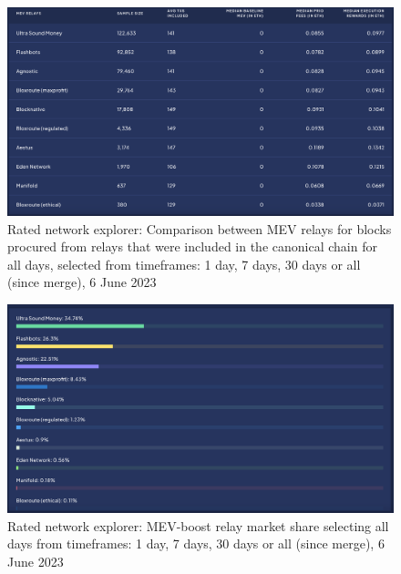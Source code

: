 \documentclass[UTF8]{article}
\begin{document}
{\begin{figure}[htbp]
\begin{center}
\includegraphics[width=\linewidth]{images/ratedrelay2}
\caption{Rated network explorer: Comparison between MEV relays for blocks procured from relays that were included in the canonical chain for all days, selected from timeframes: 1 day, 7 days, 30 days or all (since merge), 6 June 2023}
\label{fig:ratedrelay2}
\end{center}
\end{figure}

\begin{figure}[htbp]
\begin{center}
\includegraphics[width=\linewidth]{images/ratedrelay3}
\caption{Rated network explorer: MEV-boost relay market share selecting all days from timeframes: 1 day, 7 days, 30 days or all (since merge), 6 June 2023}
\label{fig:ratedrelay3}
\end{center}
\end{figure}

}
\end{document}
